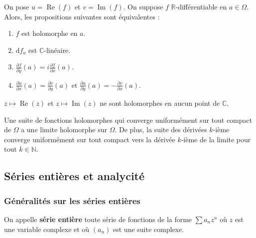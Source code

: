 
  \begin{theorem}
    On pose $u = \operatorname{Re}(f)$ et $v = \operatorname{Im}(f)$. On suppose $f$ $\mathbb{R}$-différentiable en $a \in \Omega$. Alors, les propositions suivantes sont équivalentes :
    \begin{enumerate}[label=(\roman*)]
      \item $f$ est holomorphe en $a$.
      \item $\mathrm{d}f_a$ est $\mathbb{C}$-linéaire.
      \item $\frac{\partial f}{\partial y} (a) = i \frac{\partial f}{\partial x} (a)$.
      \item $\frac{\partial u}{\partial x} (a) = \frac{\partial v}{\partial y} (a)$ et $\frac{\partial u}{\partial y} (a) = -\frac{\partial v}{\partial x} (a)$.
    \end{enumerate}
  \end{theorem}


  \begin{example}
    $z \mapsto \operatorname{Re}(z)$ et $z \mapsto \operatorname{Im}(z)$ ne sont holomorphes en aucun point de $\mathbb{C}$.
  \end{example}


  \begin{theorem}[Weierstrass]
    Une suite de fonctions holomorphes qui converge uniformément sur tout compact de $\Omega$ a une limite holomorphe sur $\Omega$. De plus, la suite des dérivées $k$-ième converge uniformément sur tout compact vers la dérivée $k$-ième de la limite pour tout $k \in \mathbb{N}$.
  \end{theorem}

  \subsection{Séries entières et analycité}

  \subsubsection{Généralités sur les séries entières}


  \begin{definition}
    On appelle \textbf{série entière} toute série de fonctions de la forme $\sum a_n z^n$ où $z$ est une variable complexe et où $(a_n)$ est une suite complexe.
  \end{definition}

